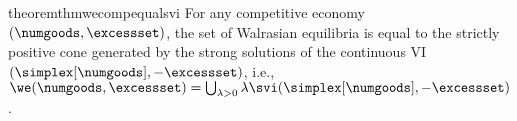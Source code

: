 
\begin{restatable}{theorem}{thmwecompequalsvi}\label{thm:we_comp_equal_svi}
     For any competitive economy $(\numgoods, \excessset)$, the set of Walrasian equilibria is equal to the strictly positive cone generated by the strong solutions of the continuous VI $(\simplex[\numgoods], -\excessset)$, i.e., $\we(\numgoods, \excessset) = \bigcup_{\lambda > 0} \lambda \svi(\simplex[\numgoods], -\excessset)$.
\end{restatable}



